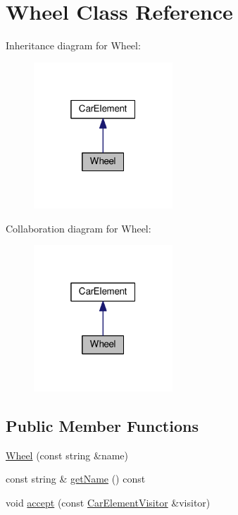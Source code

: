 \hypertarget{classWheel}{}\section{Wheel Class Reference}
\label{classWheel}


Inheritance diagram for Wheel\+:
\nopagebreak
\begin{figure}[H]
\begin{center}
\leavevmode
\includegraphics[width=148pt]{classWheel__inherit__graph}
\end{center}
\end{figure}


Collaboration diagram for Wheel\+:
\nopagebreak
\begin{figure}[H]
\begin{center}
\leavevmode
\includegraphics[width=148pt]{classWheel__coll__graph}
\end{center}
\end{figure}
\subsection*{Public Member Functions}
\begin{DoxyCompactItemize}
\item 
\hyperlink{classWheel_aa56122040fc03dbf3036fd649f749163}{Wheel} (const string \&name)
\item 
const string \& \hyperlink{classWheel_ad0ed291d1ec488ffcba12e28cb707c38}{get\+Name} () const 
\item 
void \hyperlink{classWheel_acd6f77dbc8cea2223f5fd7810f4b80a6}{accept} (const \hyperlink{structCarElementVisitor}{Car\+Element\+Visitor} \&visitor)
\end{DoxyCompactItemize}
